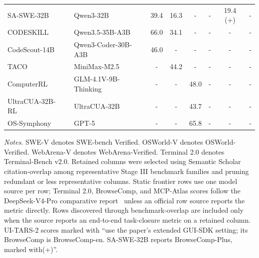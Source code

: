 \begin{table}[H]
{\begin{tabular}{@{} l|l|cccccc @{}}
SA-SWE-32B~\cite{liu2025skyrlagent} & Qwen3-32B~\cite{qwen2025qwen3} & 39.4 & 16.3 & - & - & 19.4 (+) & - \\
CODESKILL~\cite{song2026codeskill} & Qwen3.5-35B-A3B & 66.0 & 34.1 & - & - & - & - \\
CodeScout-14B~\cite{sutawika2026codescout} & Qwen3-Coder-30B-A3B & 46.0 & - & - & - & - & - \\
TACO~\cite{ren2026taco} & MiniMax-M2.5~\cite{minimax2026minimaxm25} & - & 44.2 & - & - & - & - \\
ComputerRL~\cite{lai2025computerrl} & GLM-4.1V-9B-Thinking & - & - & 48.0 & - & - & - \\
UltraCUA-32B-RL~\cite{yang2025ultracua} & UltraCUA-32B & - & - & 43.7 & - & - & - \\
OS-Symphony~\cite{yang2026ossymphony} & GPT-5 & - & - & 65.8 & - & - & - \\
\bottomrule
\end{tabular}
}
\vspace{8pt}
\noindent\parbox{\linewidth}{\normalsize \textit{Notes.} SWE-V denotes SWE-bench Verified. OSWorld-V denotes OSWorld-Verified. WebArena-V denotes WebArena-Verified. Terminal 2.0 denotes Terminal-Bench v2.0. Retained columns were selected using Semantic Scholar citation-overlap among representative Stage III benchmark families and pruning redundant or less representative columns. Static frontier rows use one model source per row; Terminal 2.0, BrowseComp, and MCP-Atlas scores follow the DeepSeek-V4-Pro comparative report~\cite{deepseekai2026deepseekv4pro} unless an official row source reports the metric directly. Rows discovered through benchmark-overlap are included only when the source reports an end-to-end task-closure metric on a retained column. UI-TARS-2 scores marked with ``use the paper's extended GUI-SDK setting; its BrowseComp is BrowseComp-en. SA-SWE-32B reports BrowseComp-Plus, marked with(+)''.}
\end{table}
